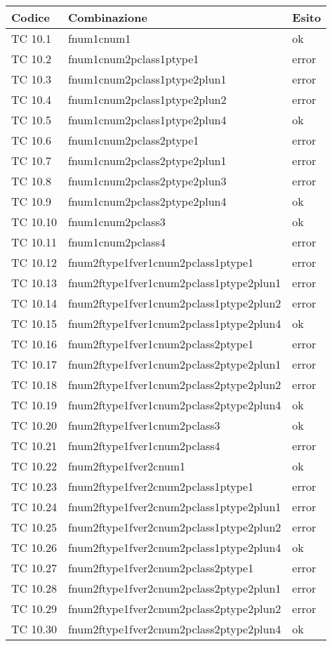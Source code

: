 \vspace{1cm}

\begin{longtable}{|p{3cm}|p{7cm}|p{3cm}|}
	\hline
	\rowcolor{Gray}
	\textbf{Codice} & \textbf{Combinazione} & \textbf{Esito}\tabularnewline
	\hline
	TC 10.1			& fnum1cnum1					& ok \tabularnewline
	\hline
	TC 10.2			& fnum1cnum2pclass1ptype1			& error \tabularnewline
	\hline
	TC 10.3			& fnum1cnum2pclass1ptype2plun1			& error \tabularnewline
	\hline
	TC 10.4			& fnum1cnum2pclass1ptype2plun2			& error \tabularnewline
	\hline
	TC 10.5			& fnum1cnum2pclass1ptype2plun4			& ok \tabularnewline
	\hline
	TC 10.6			& fnum1cnum2pclass2ptype1			& error \tabularnewline
	\hline
	TC 10.7			& fnum1cnum2pclass2ptype2plun1			& error \tabularnewline
	\hline
	TC 10.8			& fnum1cnum2pclass2ptype2plun3			& error \tabularnewline
	\hline
	TC 10.9			& fnum1cnum2pclass2ptype2plun4			& ok \tabularnewline
	\hline
	TC 10.10			& fnum1cnum2pclass3				& ok \tabularnewline
	\hline
	TC 10.11			& fnum1cnum2pclass4				& error \tabularnewline
	\hline
	TC 10.12			& fnum2ftype1fver1cnum2pclass1ptype1		& error \tabularnewline
	\hline
	TC 10.13			& fnum2ftype1fver1cnum2pclass1ptype2plun1	& error \tabularnewline
	\hline
	TC 10.14			& fnum2ftype1fver1cnum2pclass1ptype2plun2	& error \tabularnewline
	\hline
	TC 10.15			& fnum2ftype1fver1cnum2pclass1ptype2plun4	& ok \tabularnewline
	\hline
	TC 10.16			& fnum2ftype1fver1cnum2pclass2ptype1		& error \tabularnewline
	\hline
	TC 10.17			& fnum2ftype1fver1cnum2pclass2ptype2plun1	& error \tabularnewline
	\hline
	TC 10.18			& fnum2ftype1fver1cnum2pclass2ptype2plun2	& error \tabularnewline
	\hline
	TC 10.19			& fnum2ftype1fver1cnum2pclass2ptype2plun4	& ok \tabularnewline
	\hline
	TC 10.20			& fnum2ftype1fver1cnum2pclass3			& ok \tabularnewline
	\hline
	TC 10.21			& fnum2ftype1fver1cnum2pclass4			& error \tabularnewline
	\hline
	TC 10.22			& fnum2ftype1fver2cnum1				& ok \tabularnewline
	\hline
	TC 10.23			& fnum2ftype1fver2cnum2pclass1ptype1		& error \tabularnewline
	\hline
	TC 10.24			& fnum2ftype1fver2cnum2pclass1ptype2plun1	& error \tabularnewline
	\hline
	TC 10.25			& fnum2ftype1fver2cnum2pclass1ptype2plun2	& error \tabularnewline
	\hline
	TC 10.26			& fnum2ftype1fver2cnum2pclass1ptype2plun4	& ok \tabularnewline
	\hline
	TC 10.27			& fnum2ftype1fver2cnum2pclass2ptype1		& error \tabularnewline
	\hline
	TC 10.28			& fnum2ftype1fver2cnum2pclass2ptype2plun1	& error \tabularnewline
	\hline
	TC 10.29			& fnum2ftype1fver2cnum2pclass2ptype2plun2	& error \tabularnewline
	\hline
	TC 10.30			& fnum2ftype1fver2cnum2pclass2ptype2plun4	& ok \tabularnewline

\end{longtable}
